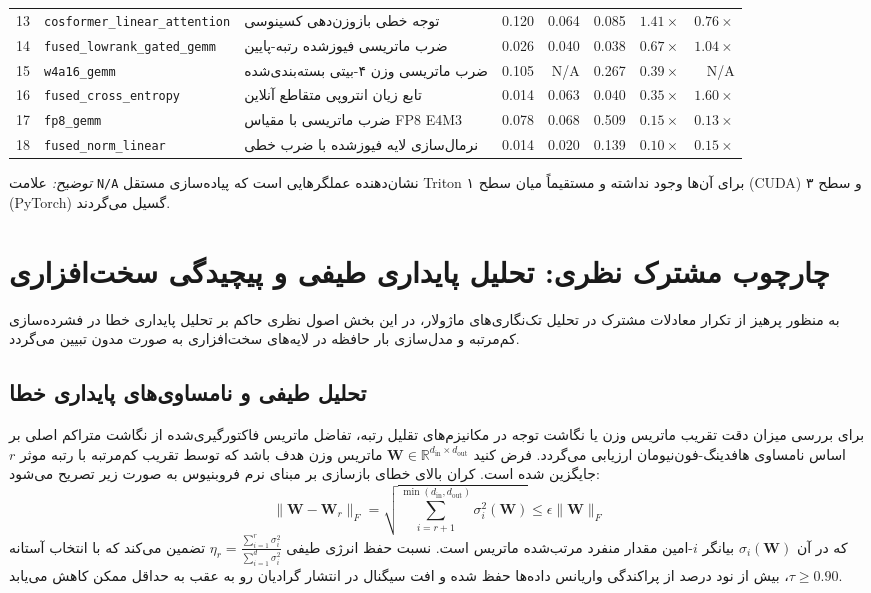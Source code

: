 \documentclass[12pt,a4paper]{report}
\theoremstyle{definition}
\begin{document}
\begin{table}[H]
\begin{tabular}{rllrrrrr}
13 & \texttt{cosformer\_linear\_attention} & توجه خطی بازوزن‌دهی کسینوسی & 0.120 & 0.064 & 0.085 & $\mathbf{1.41\times}$ & $0.76\times$ \\
14 & \texttt{fused\_lowrank\_gated\_gemm} & ضرب ماتریسی فیوزشده رتبه-پایین & 0.026 & 0.040 & 0.038 & $0.67\times$ & $\mathbf{1.04\times}$ \\
15 & \texttt{w4a16\_gemm} & ضرب ماتریسی وزن ۴-بیتی بسته‌بندی‌شده & 0.105 & N/A & 0.267 & $0.39\times$ & N/A \\
16 & \texttt{fused\_cross\_entropy} & تابع زیان انتروپی متقاطع آنلاین & 0.014 & 0.063 & 0.040 & $0.35\times$ & $\mathbf{1.60\times}$ \\
17 & \texttt{fp8\_gemm} & ضرب ماتریسی با مقیاس FP8 E4M3 & 0.078 & 0.068 & 0.509 & $0.15\times$ & $0.13\times$ \\
18 & \texttt{fused\_norm\_linear} & نرمال‌سازی لایه فیوزشده با ضرب خطی & 0.014 & 0.020 & 0.139 & $0.10\times$ & $0.15\times$ \\
\bottomrule
\end{tabular}
\par\vspace{2pt}\raggedright\scriptsize \textit{توضیح:} علامت \texttt{N/A} نشان‌دهنده عملگرهایی است که پیاده‌سازی مستقل Triton برای آن‌ها وجود نداشته و مستقیماً میان سطح ۱ (CUDA) و سطح ۳ (PyTorch) گسیل می‌گردند.
\end{table}

\section{چارچوب مشترک نظری: تحلیل پایداری طیفی و پیچیدگی سخت‌افزاری}
\label{sec:common_spectral_theory}
به منظور پرهیز از تکرار معادلات مشترک در تحلیل تک‌نگاری‌های ماژولار، در این بخش اصول نظری حاکم بر تحلیل پایداری خطا در فشرده‌سازی کم‌مرتبه و مدل‌سازی بار حافظه در لایه‌های سخت‌افزاری به صورت مدون تبیین می‌گردد.

\subsection{تحلیل طیفی و نامساوی‌های پایداری خطا}
برای بررسی میزان دقت تقریب ماتریس وزن یا نگاشت توجه در مکانیزم‌های تقلیل رتبه، تفاضل ماتریس فاکتورگیری‌شده از نگاشت متراکم اصلی بر اساس نامساوی هافدینگ-فون‌نیومان ارزیابی می‌گردد. فرض کنید $\mathbf{W} \in \mathbb{R}^{d_{\text{in}} \times d_{\text{out}}}$ ماتریس وزن هدف باشد که توسط تقریب کم‌مرتبه با رتبه موثر $r$ جایگزین شده است. کران بالای خطای بازسازی بر مبنای نرم فروبنیوس به صورت زیر تصریح می‌شود:
\begin{equation}
\label{eq:spectral_bound_general}
\| \mathbf{W} - \mathbf{W}_{r} \|_F = \sqrt{\sum_{i=r+1}^{\min(d_{\text{in}}, d_{\text{out}})} \sigma_i^2(\mathbf{W})} \le \epsilon \| \mathbf{W} \|_F
\end{equation}
که در آن $\sigma_i(\mathbf{W})$ بیانگر $i$-امین مقدار منفرد مرتب‌شده ماتریس است. نسبت حفظ انرژی طیفی $\eta_r = \frac{\sum_{i=1}^r \sigma_i^2}{\sum_{i=1}^{d} \sigma_i^2}$ تضمین می‌کند که با انتخاب آستانه $\tau \ge 0.90$، بیش از نود درصد از پراکندگی واریانس داده‌ها حفظ شده و افت سیگنال در انتشار گرادیان رو به عقب به حداقل ممکن کاهش می‌یابد.
\end{document}
